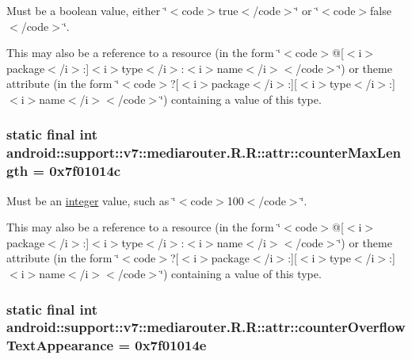 Must be a boolean value, either \char`\"{}$<$code$>$true$<$/code$>$\char`\"{} or \char`\"{}$<$code$>$false$<$/code$>$\char`\"{}. 

This may also be a reference to a resource (in the form \char`\"{}$<$code$>$@\mbox{[}$<$i$>$package$<$/i$>$:\mbox{]}$<$i$>$type$<$/i$>$:$<$i$>$name$<$/i$>$$<$/code$>$\char`\"{}) or theme attribute (in the form \char`\"{}$<$code$>$?\mbox{[}$<$i$>$package$<$/i$>$:\mbox{]}\mbox{[}$<$i$>$type$<$/i$>$:\mbox{]}$<$i$>$name$<$/i$>$$<$/code$>$\char`\"{}) containing a value of this type. \hypertarget{classandroid_1_1support_1_1v7_1_1mediarouter_1_1_r_1_1attr_701b9ebac0a0817a6f528c0008af1056}{
\subsubsection[{counterMaxLength}]{\setlength{\rightskip}{0pt plus 5cm}static final int android::support::v7::mediarouter.R.R::attr::counterMaxLength = 0x7f01014c}}
\label{classandroid_1_1support_1_1v7_1_1mediarouter_1_1_r_1_1attr_701b9ebac0a0817a6f528c0008af1056}


Must be an \hyperlink{classandroid_1_1support_1_1v7_1_1mediarouter_1_1_r_1_1integer}{integer} value, such as \char`\"{}$<$code$>$100$<$/code$>$\char`\"{}. 

This may also be a reference to a resource (in the form \char`\"{}$<$code$>$@\mbox{[}$<$i$>$package$<$/i$>$:\mbox{]}$<$i$>$type$<$/i$>$:$<$i$>$name$<$/i$>$$<$/code$>$\char`\"{}) or theme attribute (in the form \char`\"{}$<$code$>$?\mbox{[}$<$i$>$package$<$/i$>$:\mbox{]}\mbox{[}$<$i$>$type$<$/i$>$:\mbox{]}$<$i$>$name$<$/i$>$$<$/code$>$\char`\"{}) containing a value of this type. \hypertarget{classandroid_1_1support_1_1v7_1_1mediarouter_1_1_r_1_1attr_88e1527c4239cbd3d0d3ca4d4cb3ee11}{
\subsubsection[{counterOverflowTextAppearance}]{\setlength{\rightskip}{0pt plus 5cm}static final int android::support::v7::mediarouter.R.R::attr::counterOverflowTextAppearance = 0x7f01014e}}
\label{classandroid_1_1support_1_1v7_1_1mediarouter_1_1_r_1_1attr_88e1527c4239cbd3d0d3ca4d4cb3ee11}


